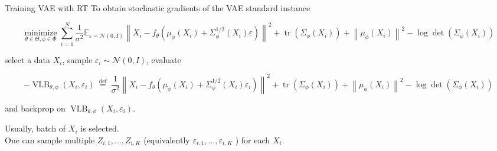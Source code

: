 \begin{frame}[allowframebreaks]

\begin{myconceptblock}{11.21}{Training VAE with RT}
    To obtain stochastic gradients of the VAE standard instance 

    $$
    \underset{\theta \in \Theta, \phi \in \Phi}{\operatorname{minimize}} \sum_{i=1}^{N} \frac{1}{\sigma^{2}} \mathbb{E}_{\varepsilon \sim \mathcal{N}(0, I)}\left\|X_{i}-f_{\theta}\left(\mu_{\phi}\left(X_{i}\right)+\Sigma_{\phi}^{1 / 2}\left(X_{i}\right) \varepsilon\right)\right\|^{2}+\operatorname{tr}\left(\Sigma_{\phi}\left(X_{i}\right)\right)+\left\|\mu_{\phi}\left(X_{i}\right)\right\|^{2}-\log \operatorname{det}\left(\Sigma_{\phi}\left(X_{i}\right)\right)
    $$

    select a data $X_{i}$, sample $\varepsilon_{i} \sim \mathcal{N}(0, I)$, evaluate

    $$
    -\operatorname{VLB}_{\theta, \phi}\left(X_{i}, \varepsilon_{i}\right) \stackrel{\text { def }}{=} \frac{1}{\sigma^{2}}\left\|X_{i}-f_{\theta}\left(\mu_{\phi}\left(X_{i}\right)+\Sigma_{\phi}^{1 / 2}\left(X_{i}\right) \varepsilon_{i}\right)\right\|^{2}+\operatorname{tr}\left(\Sigma_{\phi}\left(X_{i}\right)\right)+\left\|\mu_{\phi}\left(X_{i}\right)\right\|^{2}-\log \operatorname{det}\left(\Sigma_{\phi}\left(X_{i}\right)\right)
    $$

    and backprop on $\operatorname{VLB}_{\theta, \phi}\left(X_{i}, \varepsilon_{i}\right)$.

    Usually, batch of $X_{i}$ is selected.\\
    One can sample multiple $Z_{i, 1}, \ldots, Z_{i, K}$ (equivalently $\varepsilon_{i, 1}, \ldots, \varepsilon_{i, K}$ ) for each $X_{i}$.
\end{myconceptblock}

\end{frame}


